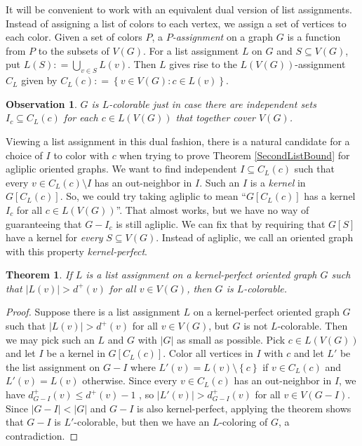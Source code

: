 \documentclass[openany]{tufte-book} %
\theoremstyle{plain}
\newtheorem{observation}{Observation}
\newtheorem{theorem}{Theorem}
\newcommand{\set}[1]{\left\{ #1 \right\}}
\newcommand{\setb}[3]{\left\{ #1 \in #2 : #3 \right\}}
\newcommand{\card}[1]{\left|#1\right|}
\newcommand{\brackets}[1]{\left[ #1 \right]}
\newcommand{\DefinedAs}{\mathrel{\mathop:}=}
\begin{document}
It will be convenient to work with an equivalent dual version of list assignments.  
Instead of assigning a list of colors to each vertex, we assign a set of vertices to each color.  Given a set of colors $P$, a \emph{$P$-assignment} on a graph $G$ is a function
from $P$ to the subsets of $V(G)$.  For a list assignment $L$ on $G$ and $S \subseteq V(G)$, put $L(S) \DefinedAs \bigcup_{v \in S} L(v)$.
Then $L$ gives rise to the $L(V(G))$-assignment $C_L$ given by $C_L(c) \DefinedAs \setb{v}{V(G)}{c \in L(v)}$.


\begin{observation}
$G$ is $L$-colorable just in case there are independent sets $I_c \subseteq C_L(c)$ for each $c \in L(V(G))$ that together cover $V(G)$.
\end{observation}

Viewing a list assignment in this dual fashion, there is a natural candidate for a choice of $I$ to color with $c$ when trying to prove Theorem \ref{SecondListBound} for agliplic oriented graphs.
We want to find independent $I \subseteq C_L(c)$ such that every $v \in C_L(c) \setminus I$ has an out-neighbor in $I$.  Such an $I$ is a \emph{kernel} in $G\brackets{C_L(c)}$.  
So, we could try taking agliplic to mean ``$G\brackets{C_L(c)}$ has a kernel $I_c$ for all $c \in L(V(G))$''.  
That almost works, but we have no way of guaranteeing that $G-I_c$ is still agliplic.  We can fix that by requiring that $G[S]$ have a kernel for \emph{every} $S\subseteq V(G)$.  
Instead of agliplic, we call an oriented graph with this property \emph{kernel-perfect}.

\begin{theorem}\label{KernelPerfectListBound}
If $L$ is a list assignment on a kernel-perfect oriented graph $G$ such that $\card{L(v)} > d^+(v)$ for all $v \in V(G)$, then $G$ is $L$-colorable.
\end{theorem}
\begin{proof}
Suppose there is a list assignment $L$ on a kernel-perfect oriented graph $G$ such that $\card{L(v)} > d^+(v)$ for all $v \in V(G)$, but $G$ is not $L$-colorable.  Then
we may pick such an $L$ and $G$ with $\card{G}$ as small as possible.  Pick $c \in L(V(G))$ and let $I$ be a kernel in $G\brackets{C_L(c)}$.  Color all vertices in $I$ with $c$
and let $L'$ be the list assignment on $G-I$ where $L'(v) = L(v) \setminus \set{c}$ if $v \in C_L(c)$ and $L'(v) = L(v)$ otherwise.  
Since every $v \in C_L(c)$ has an out-neighbor in $I$, we have $d_{G-I}^+(v) \le d^+(v) - 1$ , so 
$\card{L'(v)} > d_{G-I}^+(v)$ for all $v \in V(G-I)$.  Since $\card{G-I} < \card{G}$ and $G-I$ is also kernel-perfect, applying the theorem shows that $G-I$ is $L'$-colorable, 
but then we have an $L$-coloring of $G$, a contradiction.
\end{proof}
\end{document}
